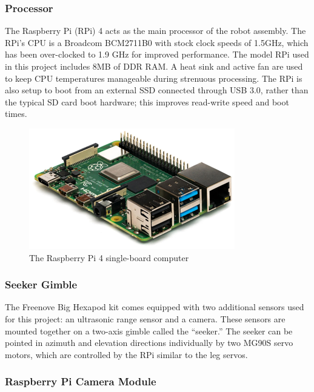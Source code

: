 \documentclass[twocolumn]{article}
\begin{document}
\subsubsection{ Processor }
The Raspberry Pi (RPi) 4 acts as the main processor of the robot assembly.  The RPi's CPU is a Broadcom BCM2711B0 with stock clock speeds of 1.5GHz, which has been over-clocked to 1.9 GHz for improved performance.  The model RPi used in this project includes 8MB of DDR RAM. A heat sink and active fan are used to keep CPU temperatures manageable during strenuous processing. The RPi is also setup to boot from an external SSD connected through USB 3.0, rather than the typical SD card boot hardware; this improves read-write speed and boot times.

\begin{figure}[H]
    \centerline{\includegraphics[scale=0.8]{figures/pi1.png}}
    \caption{The Raspberry Pi 4 single-board computer}
    \label{fig:raspberry_pi}
\end{figure}

\subsubsection{ Seeker Gimble }

The Freenove Big Hexapod kit comes equipped with two additional sensors used for this project: an ultrasonic range sensor and a camera. These sensors are mounted together on a two-axis gimble called the ``seeker.'' The seeker can be pointed in azimuth and elevation directions individually by two MG90S servo motors, which are controlled by the RPi similar to the leg servos.

\subsubsection{ Raspberry Pi Camera Module}
\end{document}
